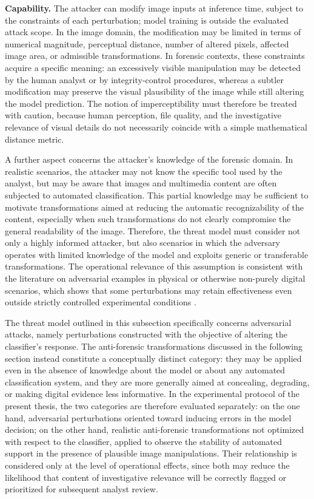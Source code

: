 \textbf{Capability.} The attacker can modify image inputs at inference time,
subject to the constraints of each perturbation; model training is outside the
evaluated attack scope.
In the image domain, the modification may be limited in terms of numerical
magnitude, perceptual distance, number of altered pixels, affected image area,
or admissible transformations. In forensic contexts, these constraints acquire
a specific meaning: an excessively visible manipulation may be detected by the
human analyst or by integrity-control procedures, whereas a subtler
modification may preserve the visual plausibility of the image while still
altering the model prediction. The notion of imperceptibility must therefore be
treated with caution, because human perception, file quality, and the
investigative relevance of visual details do not necessarily coincide with a
simple mathematical distance metric.

A further aspect concerns the attacker's knowledge of the forensic domain. In
realistic scenarios, the attacker may not know the specific tool used by the
analyst, but may be aware that images and multimedia content are often subjected
to automated classification. This partial knowledge may be sufficient to
motivate transformations aimed at reducing the automatic recognizability of the
content, especially when such transformations do not clearly compromise the
general readability of the image. Therefore, the threat model must consider not
only a highly informed attacker, but also scenarios in which the adversary
operates with limited knowledge of the model and exploits generic or
transferable transformations. The operational relevance of this assumption is
consistent with the literature on adversarial examples in physical or otherwise
non-purely digital scenarios, which shows that some perturbations may retain
effectiveness even outside strictly controlled experimental conditions
\cite{kurakin2017physical}.

The threat model outlined in this subsection specifically concerns adversarial
attacks, namely perturbations constructed with the objective of altering the
classifier's response. The anti-forensic transformations discussed in the
following section instead constitute a conceptually distinct category: they may
be applied even in the absence of knowledge about the model or about any
automated classification system, and they are more generally aimed at
concealing, degrading, or making digital evidence less informative. In the
experimental protocol of the present thesis, the two categories are therefore
evaluated separately: on the one hand, adversarial perturbations oriented toward
inducing errors in the model decision; on the other hand, realistic
anti-forensic transformations not optimized with respect to the classifier,
applied to observe the stability of automated support in the presence of
plausible image manipulations. Their relationship is considered only at the
level of operational effects, since both may reduce the likelihood that
content of investigative relevance will be correctly flagged or prioritized for
subsequent analyst review.

